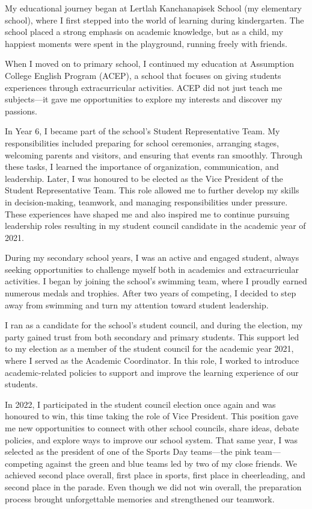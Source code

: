 \documentclass[11pt]{book}
\begin{document}
My educational journey began at Lertlah Kanchanapisek School (my elementary school), where I first stepped into the world of learning during kindergarten. The school placed a strong emphasis on academic knowledge, but as a child, my happiest moments were spent in the playground, running freely with friends. 

When I moved on to primary school, I continued my education at Assumption College English Program (ACEP), a school that focuses on giving students experiences through extracurricular activities. ACEP did not just teach me subjects—it gave me opportunities to explore my interests and discover my passions.

In Year 6, I became part of the school’s Student Representative Team. My responsibilities included preparing for school ceremonies, arranging stages, welcoming parents and visitors, and ensuring that events ran smoothly. Through these tasks, I learned the importance of organization, communication, and leadership. Later, I was honoured to be elected as the Vice President of the Student Representative Team. This role allowed me to further develop my skills in decision-making, teamwork, and managing responsibilities under pressure. These experiences have shaped me and also inspired me to continue pursuing leadership roles resulting in my student council candidate in the academic year of 2021.

During my secondary school years, I was an active and engaged student, always seeking opportunities to challenge myself both in academics and extracurricular activities. I began by joining the school’s swimming team, where I proudly earned numerous medals and trophies. After two years of competing, I decided to step away from swimming and turn my attention toward student leadership.

I ran as a candidate for the school’s student council, and during the election, my party gained trust from both secondary and primary students. This support led to my election as a member of the student council for the academic year 2021, where I served as the Academic Coordinator. In this role, I worked to introduce academic-related policies to support and improve the learning experience of our students.

In 2022, I participated in the student council election once again and was honoured to win, this time taking the role of Vice President. This position gave me new opportunities to connect with other school councils, share ideas, debate policies, and explore ways to improve our school system. That same year, I was selected as the president of one of the Sports Day teams—the pink team—competing against the green and blue teams led by two of my close friends. We achieved second place overall, first place in sports, first place in cheerleading, and second place in the parade. Even though we did not win overall, the preparation process brought unforgettable memories and strengthened our teamwork.
\end{document}
